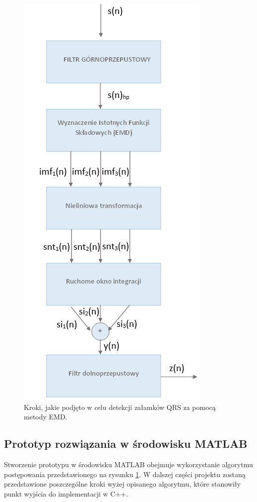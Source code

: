 \documentclass[10pt,a4paper]{article}
\begin{document}
\begin{figure}
\label{proces}
	\centerline{\includegraphics[scale=0.9]{proces}}
	\caption{Kroki, jakie podjęto w celu detekcji załamków QRS za pomocą metody EMD.}
\end{figure}
\FloatBarrier


\subsection{Prototyp rozwiązania w środowisku MATLAB}

Stworzenie prototypu w środowisku MATLAB obejmuje wykorzystanie algorytmu postępowania
przedstawionego na rysunku \ref{proces}. W dalszej części projektu zostaną przedstawione poszczególne kroki wyżej opisanego algorytmu, które stanowiły punkt wyjścia do implementacji w C++.
\end{document}
